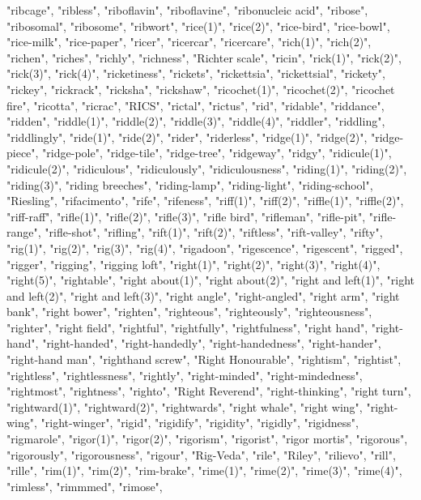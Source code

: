 "ribcage",
"ribless",
"riboflavin",
"riboflavine",
"ribonucleic acid",
"ribose",
"ribosomal",
"ribosome",
"ribwort",
"rice(1)",
"rice(2)",
"rice-bird",
"rice-bowl",
"rice-milk",
"rice-paper",
"ricer",
"ricercar",
"ricercare",
"rich(1)",
"rich(2)",
"richen",
"riches",
"richly",
"richness",
"Richter scale",
"ricin",
"rick(1)",
"rick(2)",
"rick(3)",
"rick(4)",
"ricketiness",
"rickets",
"rickettsia",
"rickettsial",
"rickety",
"rickey",
"rickrack",
"ricksha",
"rickshaw",
"ricochet(1)",
"ricochet(2)",
"ricochet fire",
"ricotta",
"ricrac",
"RICS",
"rictal",
"rictus",
"rid",
"ridable",
"riddance",
"ridden",
"riddle(1)",
"riddle(2)",
"riddle(3)",
"riddle(4)",
"riddler",
"riddling",
"riddlingly",
"ride(1)",
"ride(2)",
"rider",
"riderless",
"ridge(1)",
"ridge(2)",
"ridge-piece",
"ridge-pole",
"ridge-tile",
"ridge-tree",
"ridgeway",
"ridgy",
"ridicule(1)",
"ridicule(2)",
"ridiculous",
"ridiculously",
"ridiculousness",
"riding(1)",
"riding(2)",
"riding(3)",
"riding breeches",
"riding-lamp",
"riding-light",
"riding-school",
"Riesling",
"rifacimento",
"rife",
"rifeness",
"riff(1)",
"riff(2)",
"riffle(1)",
"riffle(2)",
"riff-raff",
"rifle(1)",
"rifle(2)",
"rifle(3)",
"rifle bird",
"rifleman",
"rifle-pit",
"rifle-range",
"rifle-shot",
"rifling",
"rift(1)",
"rift(2)",
"riftless",
"rift-valley",
"rifty",
"rig(1)",
"rig(2)",
"rig(3)",
"rig(4)",
"rigadoon",
"rigescence",
"rigescent",
"rigged",
"rigger",
"rigging",
"rigging loft",
"right(1)",
"right(2)",
"right(3)",
"right(4)",
"right(5)",
"rightable",
"right about(1)",
"right about(2)",
"right and left(1)",
"right and left(2)",
"right and left(3)",
"right angle",
"right-angled",
"right arm",
"right bank",
"right bower",
"righten",
"righteous",
"righteously",
"righteousness",
"righter",
"right field",
"rightful",
"rightfully",
"rightfulness",
"right hand",
"right-hand",
"right-handed",
"right-handedly",
"right-handedness",
"right-hander",
"right-hand man",
"righthand screw",
"Right Honourable",
"rightism",
"rightist",
"rightless",
"rightlessness",
"rightly",
"right-minded",
"right-mindedness",
"rightmost",
"rightness",
"righto",
"Right Reverend",
"right-thinking",
"right turn",
"rightward(1)",
"rightward(2)",
"rightwards",
"right whale",
"right wing",
"right-wing",
"right-winger",
"rigid",
"rigidify",
"rigidity",
"rigidly",
"rigidness",
"rigmarole",
"rigor(1)",
"rigor(2)",
"rigorism",
"rigorist",
"rigor mortis",
"rigorous",
"rigorously",
"rigorousness",
"rigour",
"Rig-Veda",
"rile",
"Riley",
"rilievo",
"rill",
"rille",
"rim(1)",
"rim(2)",
"rim-brake",
"rime(1)",
"rime(2)",
"rime(3)",
"rime(4)",
"rimless",
"rimmmed",
"rimose",
